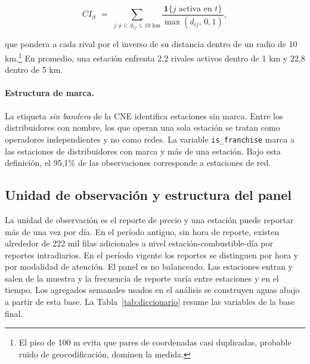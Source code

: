 \documentclass[11pt]{article}
\begin{document}
\begin{equation}
\label{eq:intensity}
\mathit{CI}_{it} \;=\; \sum_{j \neq i:\; d_{ij} \le 10\text{ km}}
\frac{\mathbf{1}\{j \text{ activa en } t\}}{\max(d_{ij},\, 0{,}1)},
\end{equation}

que pondera a cada rival por el inverso de su distancia dentro de un radio de
10 km.\footnote{El piso de 100 m evita que pares de coordenadas casi
duplicadas, probable ruido de geocodificación, dominen la medida.} En
promedio, una estación enfrenta 2,2 rivales activos dentro de 1 km y 22,8
dentro de 5 km.

\paragraph{Estructura de marca.} La etiqueta \emph{sin bandera} de la CNE
identifica estaciones sin marca. Entre los distribuidores con nombre, los que
operan una sola estación se tratan como operadores independientes y no como
redes. La variable \texttt{is\_franchise} marca a las estaciones de
distribuidores con marca y más de una estación. Bajo esta definición, el
95,1\% de las observaciones corresponde a estaciones de red.

\subsection{Unidad de observación y estructura del panel}
\label{sec:estructura}

La unidad de observación es el reporte de precio y una estación puede
reportar más de una vez por día. En el período antiguo, sin hora de reporte,
existen alrededor de 222 mil filas adicionales a nivel
estación-combustible-día por reportes intradiarios. En el período vigente los
reportes se distinguen por hora y por modalidad de atención. El panel es no
balanceado. Las estaciones entran y salen de la muestra y la frecuencia de
reporte varía entre estaciones y en el tiempo. Los agregados semanales usados
en el análisis se construyen aguas abajo a partir de esta base. La
Tabla~\ref{tab:diccionario} resume las variables de la base final.
\end{document}
